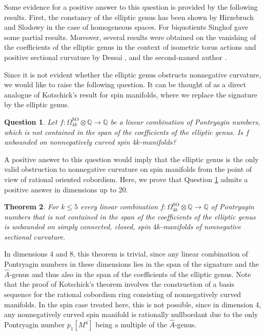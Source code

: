 \documentclass[10pt,a4paper]{amsart}
\theoremstyle{thm}
\newtheorem{thm}{Theorem}[section]
\theoremstyle{text}
\newtheorem{que}[thm]{Question}
\begin{document}
Some evidence for a positive answer to this question is provided by the following results. First, the constancy of the elliptic genus has been shown by Hirzebruch and Slodowy \cite{HS90} in the case of homogeneous spaces. For biquotients Singhof \cite{Sin93} gave some partial results. Moreover, several results were obtained on the vanishing of the  coefficients  of the elliptic genus in the context of isometric torus actions and positive sectional curvature by Dessai  \cite{Des05}, \cite{Des07} and the second-named author \cite{Wei13}.

Since it is not evident whether the elliptic genus obstructs nonnegative curvature, we would like to raise the following question. It can be thought of as a direct analogue of Kotschick's result for spin manifolds, where we replace the signature by the elliptic genus.

 \begin{que}\label{queunbondedpontryagin}
Let $f: \Omega_{4k}^{\textrm{SO}} \otimes {\mathbb{Q}} \rightarrow {\mathbb{Q}}$ be a linear combination of Pontryagin numbers, which is not contained in the span of the coefficients of the elliptic genus. Is $f$ unbounded on nonnegatively curved spin $4k$-manifolds?
\end{que} 

A positive answer to this question would imply that the elliptic genus is the only valid obstruction to nonnegative curvature on spin manifolds from the point of view of rational oriented cobordism. Here, we prove that Question \ref{queunbondedpontryagin} admits a positive answer in dimensions up to 20.
\begin{thm} \label{thmquestionsle20}
For $k\leq5$ every linear combination $f: \Omega_{4k}^{\textrm{SO}} \otimes {\mathbb{Q}} \rightarrow {\mathbb{Q}}$ of Pontryagin numbers that is not contained in the span of the coefficients of the elliptic genus is unbounded on simply connected, closed,  spin $4k$-manifolds of nonnegative sectional curvature.
\end{thm}
In dimensions 4 and 8, this theorem is trivial, since any linear combination of Pontryagin numbers in these dimensions lies in the span of the signature and the $\hat{A}$-genus and thus also in the span of the coefficients of the elliptic genus. Note that the proof of Kotschick's theorem involves the construction of a basis sequence for the rational cobordism ring consisting of nonnegatively curved manifolds. In the spin case treated here, this is not possible, since in dimension 4, any nonnegatively curved spin manifold is rationally nullbordant due to the only Pontryagin number $p_1[M^4]$ being a multiple of the $\hat{A}$-genus.
\end{document}
